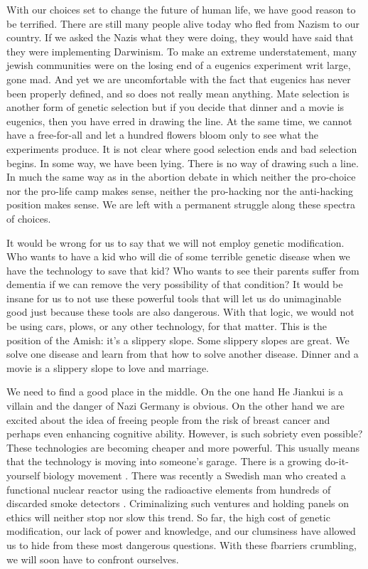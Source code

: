 With our choices set to change the future of human life, we have good reason to be terrified.
There are still many people alive today who fled from Nazism to our country.
If we asked the Nazis what they were doing, they would have said that they were implementing Darwinism.
To make an extreme understatement, many jewish communities were on the losing end of a eugenics experiment writ large, gone mad.
And yet we are uncomfortable with the fact that eugenics has never been properly defined, and so does not really mean anything.
Mate selection is another form of genetic selection but if you decide that dinner and a movie is eugenics, then you have erred in drawing the line.
At the same time, we cannot have a free-for-all and let a hundred flowers bloom only to see what the experiments produce.
It is not clear where good selection ends and bad selection begins.
In some way, we have been lying.
There is no way of drawing such a line.
In much the same way as in the abortion debate in which neither the pro-choice nor the pro-life camp makes sense, neither the pro-hacking nor the anti-hacking position makes sense.
We are left with a permanent struggle along these spectra of choices.

It would be wrong for us to say that we will not employ genetic modification.
Who wants to have a kid who will die of some terrible genetic disease when we have the technology to save that kid?
Who wants to see their parents suffer from dementia if we can remove the very possibility of that condition?
It would be insane for us to not use these powerful tools that will let us do unimaginable good just because these tools are also dangerous.
With that logic, we would not be using cars, plows, or any other technology, for that matter.
This is the position of the Amish: it's a slippery slope.
Some slippery slopes are great.
We solve one disease and learn from that how to solve another disease.
Dinner and a movie is a slippery slope to love and marriage.

We need to find a good place in the middle.
On the one hand He Jiankui is a villain and the danger of Nazi Germany is obvious.
On the other hand we are excited about the idea of freeing people from the risk of breast cancer and perhaps even enhancing cognitive ability.
However, is such sobriety even possible?
These technologies are becoming cheaper and more powerful.
This usually means that the technology is moving into someone's garage.
There is a growing do-it-yourself biology movement \cite{Kolodziejczyk2017}.
There was recently a Swedish man who created a functional nuclear reactor using the radioactive elements from hundreds of discarded smoke detectors \cite{Taylor2011}.
Criminalizing such ventures and holding panels on ethics will neither stop nor slow this trend.
So far, the high cost of genetic modification, our lack of power and knowledge, and our clumsiness have allowed us to hide from these most dangerous questions.
With these fbarriers crumbling, we will soon have to confront ourselves.

